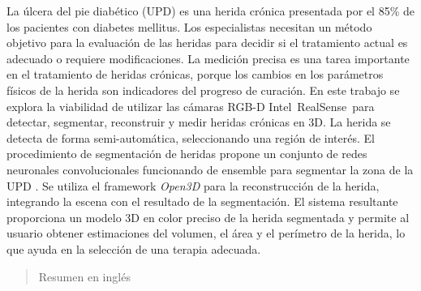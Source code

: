 \begin{resumen}
	La úlcera del pie diabético (UPD) es una herida crónica presentada por el 85\% de los pacientes con diabetes mellitus. Los especialistas necesitan un método objetivo para la evaluación de las heridas para decidir si el tratamiento actual es adecuado o requiere modificaciones. La medición precisa es una tarea importante en el tratamiento de heridas crónicas, porque los cambios en los parámetros físicos de la herida son indicadores del progreso de curación. En este trabajo se explora la viabilidad de utilizar las cámaras RGB-D Intel\textregistered~RealSense\texttrademark~para detectar, segmentar, reconstruir y medir heridas crónicas en 3D. La herida se detecta de forma semi-automática, seleccionando una región de interés. El procedimiento de segmentación de heridas  propone un conjunto de redes neuronales convolucionales funcionando de ensemble para segmentar la zona de la UPD . Se utiliza el framework \textit{Open3D} para la reconstrucción de la herida, integrando la escena con el resultado de la segmentación. El sistema resultante proporciona un modelo 3D en color preciso de la herida segmentada y permite al usuario obtener estimaciones del volumen, el área y el perímetro de la herida, lo que ayuda en la selección de una terapia adecuada.
\end{resumen}

\begin{abstract}
	Resumen en inglés
\end{abstract}
